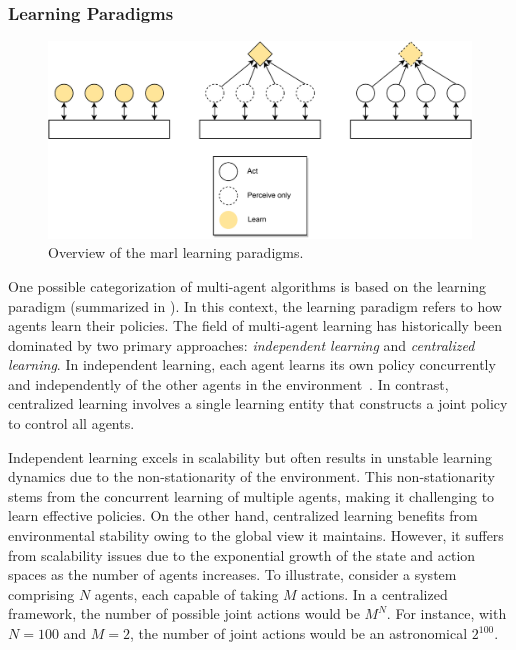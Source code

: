 \subsubsection{Learning Paradigms}
\begin{figure}
  \includegraphics[width=\textwidth]{chapters/img/marl-policy-kind.drawio.pdf}
  \caption{Overview of the \ac{marl} learning paradigms.}\label{fig:marl:policy-kind}
\end{figure}
\sloppy
One possible categorization of multi-agent algorithms is based on the learning paradigm (summarized in ). 
 In this context, the learning paradigm refers to how agents learn their policies. 
The field of multi-agent learning has historically been dominated by two primary approaches: 
 \emph{independent learning} and \emph{centralized learning}. 
 In independent learning, 
 each agent learns its own policy concurrently and independently of the other agents in the environment~\cite{tan1993multi}. 
 In contrast, centralized learning involves a single learning entity that constructs a joint policy to control all agents.
 
Independent learning excels in scalability but often results in unstable learning dynamics due to the non-stationarity of the environment. 
This non-stationarity stems from the concurrent learning of multiple agents, 
 making it challenging to learn effective policies. 
%
On the other hand, centralized learning benefits from environmental stability owing to the global view it maintains. 
 However, it suffers from scalability issues due to the exponential growth of the state and action spaces as the number of agents increases.
%
To illustrate, consider a system comprising \( N \) agents, 
 each capable of taking \( M \) actions. 
 In a centralized framework, the number of possible joint actions would be \( M^N \). 
 For instance, with \( N=100 \) and \( M=2 \), the number of joint actions would be an astronomical \( 2^{100} \).

